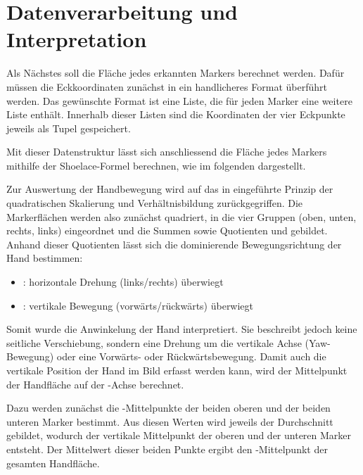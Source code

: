 \section{Datenverarbeitung und Interpretation}

Als Nächstes soll die Fläche jedes erkannten Markers berechnet werden.
Dafür müssen die Eckkoordinaten zunächst in ein handlicheres Format überführt werden.
Das gewünschte Format ist eine Liste, die für jeden Marker eine weitere Liste enthält.\footnotemark{}
Innerhalb dieser Listen sind die Koordinaten der vier Eckpunkte jeweils als Tupel gespeichert.

Mit dieser Datenstruktur lässt sich anschliessend die Fläche jedes Markers mithilfe der Shoelace-Formel berechnen, wie im folgenden  dargestellt.


Zur Auswertung der Handbewegung wird auf das in  eingeführte Prinzip der quadratischen Skalierung und Verhältnisbildung zurückgegriffen.
Die Markerflächen werden also zunächst quadriert, in die vier Gruppen (oben, unten, rechts, links) eingeordnet und die Summen sowie Quotienten  und  gebildet.
Anhand dieser Quotienten lässt sich die dominierende Bewegungsrichtung der Hand bestimmen:

\begin{itemize}
    \item {}: horizontale Drehung (links/rechts) überwiegt
    \item {}: vertikale Bewegung (vorwärts/rückwärts) überwiegt
\end{itemize}

Somit wurde die Anwinkelung der Hand interpretiert.
Sie beschreibt jedoch keine seitliche Verschiebung, sondern eine Drehung um die vertikale Achse (Yaw-Bewegung) oder eine Vorwärts- oder Rückwärtsbewegung.
Damit auch die vertikale Position der Hand im Bild erfasst werden kann, wird der Mittelpunkt\footnotemark{} der Handfläche auf der -Achse berechnet.

Dazu werden zunächst die -Mittelpunkte der beiden oberen und der beiden unteren Marker bestimmt.
Aus diesen Werten wird jeweils der Durchschnitt gebildet, wodurch der vertikale Mittelpunkt der oberen und der unteren Marker entsteht.
Der Mittelwert dieser beiden Punkte ergibt den -Mittelpunkt der gesamten Handfläche.

